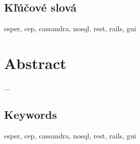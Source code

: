 \documentclass[12pt, a4paper, oneside]{book} %
\begin{document}
\section*{Kľúčové slová}
esper, cep, cassandra, nosql, rest, rails, gui \emptydoublepage

\chapter*{Abstract}
...


\section*{Keywords}
esper, cep, cassandra, nosql, rest, rails, gui \emptydoublepage

\tableofcontents \emptydoublepage

\mainmatter












\backmatter

	\emptydoublepage

\listoffigures \emptydoublepage
\listoftables
\end{document}

